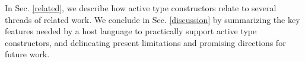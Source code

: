 \documentclass[9pt]{sigplanconf}
\newcommand{\lstinlinep}[1]{\lstinline[language=Python,basicstyle=\ttfamily\small,deletendkeywords={tuple,buffer,map}]{#1}}
\begin{document}


In Sec.  \ref{related}, we describe how active type constructors relate to several threads of related work. We conclude in Sec. \ref{discussion} by summarizing the key features needed by a host language to practically support active type constructors, and delineating present limitations and promising directions for future work. %
\end{document}
